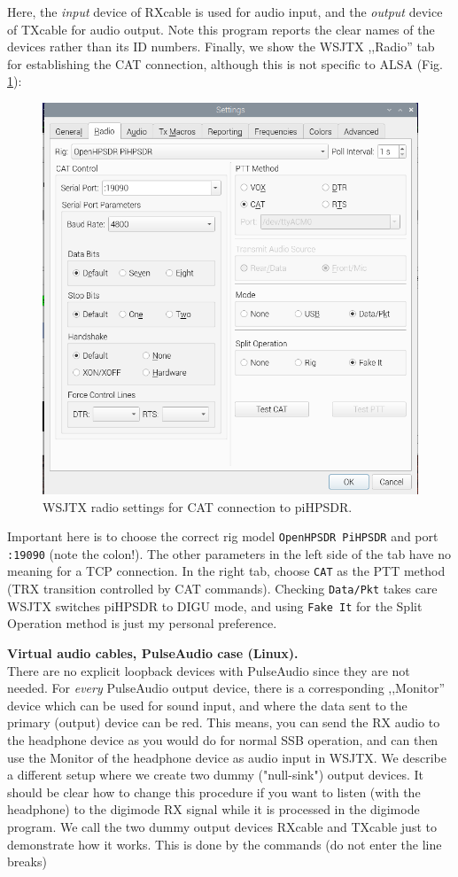 \documentclass[12pt]{book}
\def\rett#1{\texttt{\color{red}#1}}
\begin{document}
Here, the \textit{input} device of RXcable is used for audio input, and the
\textit{output} device of TXcable for audio output. Note this program reports the
clear names of the devices rather than its ID numbers. Finally, we show the WSJTX ,,Radio''
tab for establishing the CAT connection, although this is not specific to ALSA
(Fig. \ref{fig:wsjtx_settings_radio}):

\begin{figure}[ht]
\center
\includegraphics[width=12cm]{wsjtx_settings_radio.png}
\caption{WSJTX radio settings for CAT connection to piHPSDR.}
\label{fig:wsjtx_settings_radio}
\end{figure}

Important here is to choose the correct rig model \rett{OpenHPSDR PiHPSDR} and
port \rett{:19090} (note the colon!). The other parameters in the left side of the tab
have no meaning for a TCP connection. In the right tab, choose \rett{CAT} as
the PTT method (TRX transition controlled by CAT commands). Checking \rett{Data/Pkt}
takes care WSJTX switches piHPSDR to DIGU mode, and using \rett{Fake It} for the Split
Operation method is just my personal preference.

\clearpage
\textbf{\color{red}Virtual audio cables, PulseAudio case (Linux).}\\
There are no explicit loopback devices with PulseAudio since they are not needed.
For \textit{every} PulseAudio output device, there is a corresponding ,,Monitor'' device
which can be used for sound input, and where the data sent to the primary (output) device
can be red. This means, you can send the RX audio to the headphone device as you would do
for normal SSB operation, and can then use the Monitor of the headphone device as audio
input in WSJTX. We describe a different setup where we create two dummy 
 ("null-sink") output devices. It should be clear how to change this procedure if
 you want to listen (with the headphone) to the digimode RX signal while it is processed
 in the digimode program.  We call the two dummy output devices
 RXcable and TXcable just to demonstrate how it works.
  This is done by the commands (do not enter the line breaks)
\end{document}
